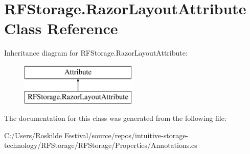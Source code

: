 \hypertarget{class_r_f_storage_1_1_razor_layout_attribute}{}\section{R\+F\+Storage.\+Razor\+Layout\+Attribute Class Reference}
\label{class_r_f_storage_1_1_razor_layout_attribute}
Inheritance diagram for R\+F\+Storage.\+Razor\+Layout\+Attribute\+:\begin{figure}[H]
\begin{center}
\leavevmode
\includegraphics[height=2.000000cm]{class_r_f_storage_1_1_razor_layout_attribute}
\end{center}
\end{figure}


The documentation for this class was generated from the following file\+:\begin{DoxyCompactItemize}
\item 
C\+:/\+Users/\+Roskilde Festival/source/repos/intuitive-\/storage-\/technology/\+R\+F\+Storage/\+R\+F\+Storage/\+Properties/Annotations.\+cs\end{DoxyCompactItemize}
